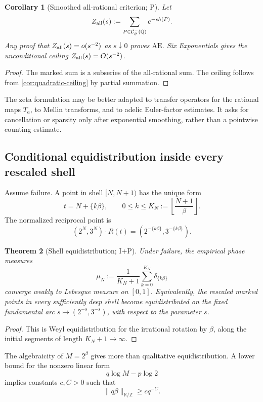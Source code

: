 \documentclass[10pt,oneside]{article}
\newtheorem{theorem}{Theorem}[section]
\newtheorem{corollary}[theorem]{Corollary}
\theoremstyle{definition}
\theoremstyle{remark}
\newcommand{\Z}{\mathbb Z}
\newcommand{\Q}{\mathbb Q}
\newcommand{\R}{\mathbb R}
\newcommand{\thetaq}{\vartheta}
\newcommand{\rec}{\mathcal C^-_{\thetaq}}
\newcommand{\AEconj}{\mathrm{AE}}
\newcommand{\statusP}{\textsc{P}}
\newcommand{\statusI}{\textsc{I}}
\begin{document}
\begin{corollary}[Smoothed all-rational criterion; \statusP]
\label{cor:all-rational-zeta}
Let
\[
 Z_{\rm all}(s):=
 \sum_{P\in\rec(\Q)}e^{-s h(P)}.
\]
Any proof that \(Z_{\rm all}(s)=o(s^{-2})\) as \(s\downarrow0\) proves \(\AEconj\).  Six Exponentials gives the unconditional ceiling \(Z_{\rm all}(s)=O(s^{-2})\).
\end{corollary}

\begin{proof}
The marked sum is a subseries of the all-rational sum.  The ceiling follows from \cref{cor:quadratic-ceiling} by partial summation.
\end{proof}

The zeta formulation may be better adapted to transfer operators for the rational maps \(T_a\), to Mellin transforms, and to adelic Euler-factor estimates.  It asks for cancellation or sparsity only after exponential smoothing, rather than a pointwise counting estimate.

\subsection{Conditional equidistribution inside every rescaled shell}
Assume failure.  A point in shell \([N,N+1)\) has the unique form
\[
 t=N+\{k\beta\},
 \qquad
 0\le k\le K_N:=\left\lfloor\frac{N+1}{\beta}\right\rfloor.
\]
The normalized reciprocal point is
\[
 (2^N,3^N)\cdot R(t)
 =\left(2^{-\{k\beta\}},3^{-\{k\beta\}}\right).
\]

\begin{theorem}[Shell equidistribution; \statusI+\statusP]
\label{thm:shell-equidistribution}
Under failure, the empirical phase measures
\[
 \mu_N:=\frac1{K_N+1}\sum_{k=0}^{K_N}\delta_{\{k\beta\}}
\]
converge weakly to Lebesgue measure on \([0,1]\).  Equivalently, the rescaled marked points in every sufficiently deep shell become equidistributed on the fixed fundamental arc
\(s\mapsto(2^{-s},3^{-s})\), with respect to the parameter \(s\).
\end{theorem}

\begin{proof}
This is Weyl equidistribution for the irrational rotation by \(\beta\), along the initial segments of length \(K_N+1\to\infty\).
\end{proof}

The algebraicity of \(M=2^\beta\) gives more than qualitative equidistribution.  A lower bound for the nonzero linear form
\[
 q\log M-p\log2
\]
implies constants \(c,C>0\) such that
\begin{equation}
 \|q\beta\|_{\R/\Z}\ge cq^{-C}.
\label{eq:finite-irrationality-beta}
\end{equation}
\end{document}
